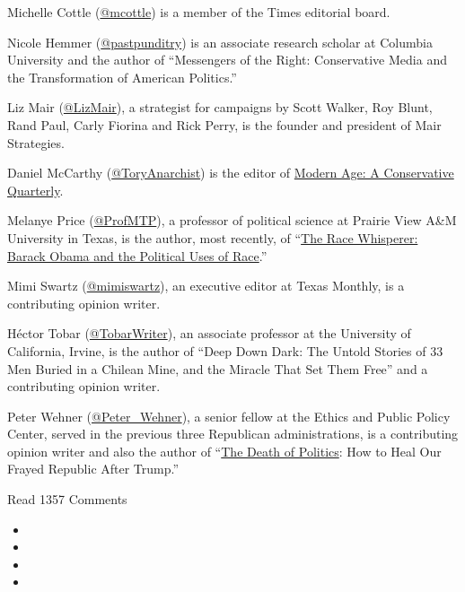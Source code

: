 Michelle Cottle (\href{https://twitter.com/mcottle}{@mcottle}) is a
member of the Times editorial board.

Nicole Hemmer
(\href{https://twitter.com/pastpunditry?ref_src=twsrc\%5Egoogle\%7Ctwcamp\%5Eserp\%7Ctwgr\%5Eauthor}{@pastpunditry})
is an associate research scholar at Columbia University and the author
of ``Messengers of the Right: Conservative Media and the Transformation
of American Politics.''

Liz Mair (\href{https://twitter.com/LizMair}{@LizMair}), a strategist
for campaigns by Scott Walker, Roy Blunt, Rand Paul, Carly Fiorina and
Rick Perry, is the founder and president of Mair Strategies.

Daniel McCarthy
(\href{https://twitter.com/ToryAnarchist}{@ToryAnarchist}) is the editor
of \href{https://home.isi.org/modern-age}{Modern Age: A Conservative
Quarterly}.

Melanye Price (\href{https://twitter.com/ProfMTP}{@ProfMTP}), a
professor of political science at Prairie View A\&M University in Texas,
is the author, most recently, of
``\href{https://nyupress.org/9781479819256/the-race-whisperer/}{The Race
Whisperer: Barack Obama and the Political Uses of Race}.''

Mimi Swartz (\href{https://twitter.com/mimiswartz}{@mimiswartz}), an
executive editor at Texas Monthly, is a contributing opinion writer.

Héctor Tobar
(\href{https://twitter.com/TobarWriter?ref_src=twsrc\%5Egoogle\%7Ctwcamp\%5Eserp\%7Ctwgr\%5Eauthor}{@TobarWriter}),
an associate professor at the University of California, Irvine, is the
author of ``Deep Down Dark: The Untold Stories of 33 Men Buried in a
Chilean Mine, and the Miracle That Set Them Free'' and a contributing
opinion writer.

Peter Wehner
(\href{https://twitter.com/Peter_Wehner?ref_src=twsrc\%5Egoogle\%7Ctwcamp\%5Eserp\%7Ctwgr\%5Eauthor}{@Peter\_Wehner}),
a senior fellow at the Ethics and Public Policy Center, served in the
previous three Republican administrations, is a contributing opinion
writer and also the author of
``\href{https://www.harpercollins.com/9780062820792/the-death-of-politics/}{The
Death of Politics}: How to Heal Our Frayed Republic After Trump.''

Read 1357 Comments

\begin{itemize}
\item
\item
\item
\item
\end{itemize}

